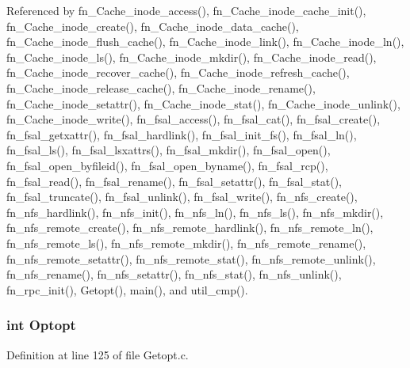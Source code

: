 Referenced by fn\_\-Cache\_\-inode\_\-access(), fn\_\-Cache\_\-inode\_\-cache\_\-init(), fn\_\-Cache\_\-inode\_\-create(), fn\_\-Cache\_\-inode\_\-data\_\-cache(), fn\_\-Cache\_\-inode\_\-flush\_\-cache(), fn\_\-Cache\_\-inode\_\-link(), fn\_\-Cache\_\-inode\_\-ln(), fn\_\-Cache\_\-inode\_\-ls(), fn\_\-Cache\_\-inode\_\-mkdir(), fn\_\-Cache\_\-inode\_\-read(), fn\_\-Cache\_\-inode\_\-recover\_\-cache(), fn\_\-Cache\_\-inode\_\-refresh\_\-cache(), fn\_\-Cache\_\-inode\_\-release\_\-cache(), fn\_\-Cache\_\-inode\_\-rename(), fn\_\-Cache\_\-inode\_\-setattr(), fn\_\-Cache\_\-inode\_\-stat(), fn\_\-Cache\_\-inode\_\-unlink(), fn\_\-Cache\_\-inode\_\-write(), fn\_\-fsal\_\-access(), fn\_\-fsal\_\-cat(), fn\_\-fsal\_\-create(), fn\_\-fsal\_\-getxattr(), fn\_\-fsal\_\-hardlink(), fn\_\-fsal\_\-init\_\-fs(), fn\_\-fsal\_\-ln(), fn\_\-fsal\_\-ls(), fn\_\-fsal\_\-lsxattrs(), fn\_\-fsal\_\-mkdir(), fn\_\-fsal\_\-open(), fn\_\-fsal\_\-open\_\-byfileid(), fn\_\-fsal\_\-open\_\-byname(), fn\_\-fsal\_\-rcp(), fn\_\-fsal\_\-read(), fn\_\-fsal\_\-rename(), fn\_\-fsal\_\-setattr(), fn\_\-fsal\_\-stat(), fn\_\-fsal\_\-truncate(), fn\_\-fsal\_\-unlink(), fn\_\-fsal\_\-write(), fn\_\-nfs\_\-create(), fn\_\-nfs\_\-hardlink(), fn\_\-nfs\_\-init(), fn\_\-nfs\_\-ln(), fn\_\-nfs\_\-ls(), fn\_\-nfs\_\-mkdir(), fn\_\-nfs\_\-remote\_\-create(), fn\_\-nfs\_\-remote\_\-hardlink(), fn\_\-nfs\_\-remote\_\-ln(), fn\_\-nfs\_\-remote\_\-ls(), fn\_\-nfs\_\-remote\_\-mkdir(), fn\_\-nfs\_\-remote\_\-rename(), fn\_\-nfs\_\-remote\_\-setattr(), fn\_\-nfs\_\-remote\_\-stat(), fn\_\-nfs\_\-remote\_\-unlink(), fn\_\-nfs\_\-rename(), fn\_\-nfs\_\-setattr(), fn\_\-nfs\_\-stat(), fn\_\-nfs\_\-unlink(), fn\_\-rpc\_\-init(), Getopt(), main(), and util\_\-cmp().
\subsubsection{\setlength{\rightskip}{0pt plus 5cm}int {\bf Optopt}}\label{Getopt_8h_a2}




Definition at line 125 of file Getopt.c.

